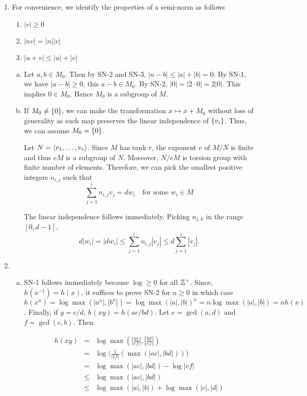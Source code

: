 \documentclass{article}
\theoremstyle{definition}
\theoremstyle{remark}
\begin{document}
\begin{enumerate}[(1)]
  \item
        For convenience, we identify the properties of a semi-norm as follows
        \begin{enumerate}[SN-1]
          \item $|v| \geq 0$ \label{sn1}
          \item $|nv| = |n||v|$ \label{sn2}
          \item $|u + v| \leq |u| + |v|$ \label{sn3}
        \end{enumerate}


        \begin{enumerate}[(a)]
          \item Let $a, b \in M_0$.  Then by SN-2 and SN-3, $|u - b| \leq |a| + |b| = 0$. By SN-1, we have $|a - b| \geq 0$, this $a - b \in M_0$. By SN-2, $|0| = |2 \cdot 0| = 2|0|.$ This implies $0 \in M_0.$ Hence $M_0$ is a subgroup of $M$.

          \item If $M_0 \neq \{0\}$,  we can make the transformation $x \mapsto x + M_0$ without loss of generality as such map preserves the linear independence of $\{v_i\}$. Thus, we can assume $M_0 = \{0\}.$

          Let $N = \langle v_1, \dots, v_r \rangle$. Since $M$ has rank $r$, the exponent $e$ of $M/N$ is finite and thus $eM$ is a subgroup of $N$. Moreover, $N/eM$ is torsion group with finite number of elements. Therefore, we can pick the smallest positive integers $n_{i, j}$ such that
                $$\sum_{j = 1}^i n_{i, j}v_j = dw_i \quad \text{for some }  w_i \in M$$

                The linear independence follows immediately. Picking $n_{j, k}$ in the range $[0, d - 1]$,
                $$d |w_i| = |dw_i| \leq \sum_{j = 1}^i n_{i, j}|v_j| \leq d\sum_{j = 1}^i |v_j| .$$
        \end{enumerate}

  \item
        \begin{enumerate}[(a)]
          \item SN-1 follows immediately because $\log \geq 0$ for all $\mathbb{Z}^+$. Since, $h(x^{-1}) = h(x)$, it suffices to prove SN-2 for $n \geq 0$ in which case  $h(x^n) = \log \max(|a^n|, |b^n|) = \log \max(|a|, |b|)^n = n \log \max(|a|, |b|) = nh(x)$. Finally, if $y = c/d$,  $h(xy) = h(ac/bd)$. Let $e = \gcd(a, d)$ and $f = \gcd(c, b).$  Then

                \begin{eqnarray*}
                  h(xy) & = & \log \max(|\frac{ac}{ef}|, |\frac{bd}{ef}|) \\
                  & = & \log \big(\frac{1}{|ef|}(\max(|ac|, |bd|))\big) \\
                  & = & \log \max(|ac|,  |bd|) - \log |ef| \\
                        & \leq &  \log \max(|ac|, |bd|) \\
                  & \leq & \log \max(|a|, |b|) + \log \max(|c|, |d|)
                \end{eqnarray*}


\end{enumerate}
\end{enumerate}
\end{document}
